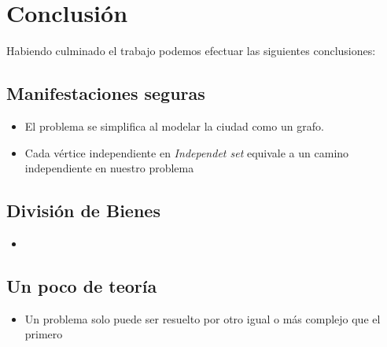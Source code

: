 \section{Conclusión}
Habiendo culminado el trabajo podemos efectuar las siguientes conclusiones:
 \subsection{Manifestaciones seguras}    
\begin{itemize}
    \item El problema se simplifica al modelar la ciudad como un grafo.
    \item Cada vértice independiente en \emph{Independet set} equivale a un camino independiente en nuestro problema
\end{itemize}
 \subsection{División de Bienes}    
\begin{itemize}
    \item 
\end{itemize}
\subsection{Un poco de teoría}    
\begin{itemize}
    \item Un problema solo puede ser resuelto por otro igual o más complejo que el primero
\end{itemize}
